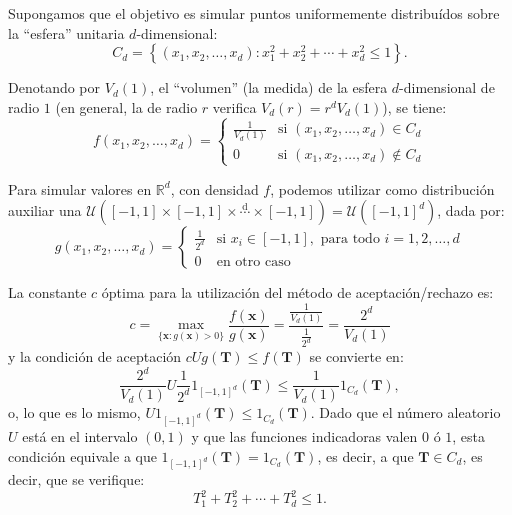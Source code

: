 \documentclass[
]{book}
\theoremstyle{break}
\theoremstyle{definition}
\theoremstyle{definition}
\theoremstyle{definition}
\theoremstyle{remark}
\begin{document}
Supongamos que el objetivo es simular puntos uniformemente distribuídos sobre la ``esfera''
unitaria \(d\)-dimensional:
\[C_d=\left\{  \left( x_1, x_2, \ldots, x_d \right) 
: x_1^2 + x_2^2 + \cdots + x_d^2 \leq1 \right\}.\]

Denotando por \(V_d\left( 1\right)\), el ``volumen'' (la medida) de la
esfera \(d\)-dimensional de radio \(1\) (en general, la de radio \(r\)
verifica \(V_d\left( r\right) =r^{d}V_d\left( 1\right)\)), se tiene:
\[f\left( x_1,x_2,\ldots,x_d\right)  =\left\{
\begin{array}{ll}
\frac{1}{V_d\left( 1\right)  } & \text{si } \left( x_1, x_2, \ldots
,x_d\right)  \in C_d\\
0 & \text{si } \left( x_1,x_2,\ldots,x_d\right)  \notin C_d
\end{array} \right.\]

Para simular valores en \(\mathbb{R}^{d}\), con densidad \(f\),
podemos utilizar como distribución auxiliar una
\(\mathcal{U}\left( \left[ -1,1\right] \times\left[ -1,1\right] \times\overset{\text{d}}{\cdots}\times\left[ -1,1\right] \right) = \mathcal{U}\left( \left[ -1,1\right]^{d}\right)\), dada por:
\[g\left( x_1,x_2,\ldots,x_d\right)  =\left\{
\begin{array}{ll}
\frac{1}{2^{d}} & \text{si } x_i\in\left[  -1,1\right], \text{ para todo }
i=1,2,\ldots,d\\
0 &  \text{en otro caso}
\end{array}\right.\]

La constante \(c\) óptima para la utilización del método de
aceptación/rechazo es:
\[c=\max_{\{\mathbf{x}:g\left( \mathbf{x}\right) > 0\}}
\frac{f\left( \mathbf{x}\right)  }{g\left( \mathbf{x}\right)  }
=\frac{\frac{1}{V_d\left( 1\right)  }}{\frac{1}{2^{d}}}
=\frac{2^{d}}{V_d\left( 1\right)}\]
y la condición de aceptación \(cUg\left( \mathbf{T}\right) \leq f\left( \mathbf{T}\right)\) se convierte en:
\[\frac{2^{d}}{V_d\left( 1\right)  }U\frac{1}{2^{d}}1_{\left[  -1,1\right]
^{d}}\left( \mathbf{T}\right)  \leq\frac{1}{V_d\left( 1\right)
}1_{C_d}\left( \mathbf{T}\right),\]
o, lo que es lo mismo, \(U1_{\left[ -1,1\right]^{d}}\left( \mathbf {T}\right) \leq1_{C_d}\left( \mathbf{T}\right)\).
Dado que el número aleatorio \(U\) está en el intervalo \((0,1)\) y que las funciones
indicadoras valen \(0\) ó \(1\), esta condición equivale a que \(1_{\left[ -1,1\right] ^{d}}\left( \mathbf{T}\right) =1_{C_d}\left( \mathbf{T}\right)\), es decir, a que
\(\mathbf{T}\in C_d\), es decir, que se verifique:
\[T_1^2+T_2^2+\cdots+T_d^2\leq1.\]
\end{document}
